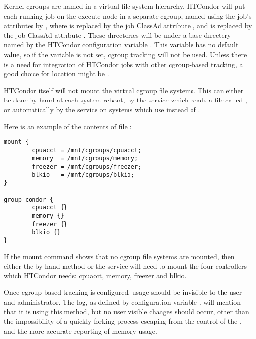 Kernel cgroups are named in a virtual file system hierarchy. 
HTCondor will put each
running job on the execute node in a separate cgroup, 
named using the job's attributes by ,
where  is replaced by 
the job ClassAd attribute ,
and  is replaced by 
the job ClassAd attribute .
These directories will be under a base directory named 
by the HTCondor configuration variable .  
This variable has no default value, so if the variable is not set,
cgroup tracking will not be used.  
Unless there is a need for integration of HTCondor jobs with other
cgroup-based tracking, 
a good choice for  location might be . 

HTCondor itself will not mount the virtual cgroup file systems.  
This can either be done by hand at each system reboot, 
by the  service 
which reads a file called , 
or automatically by the  service 
on systems which use  instead of .

Here is an example of the contents of file :

\begin{verbatim}
mount {
        cpuacct = /mnt/cgroups/cpuacct;
        memory  = /mnt/cgroups/memory;
        freezer = /mnt/cgroups/freezer;
        blkio   = /mnt/cgroups/blkio;
}

group condor {
        cpuacct {}
        memory {}
        freezer {}
        blkio {}
}
\end{verbatim}

If the mount command shows that no cgroup file systems are mounted, 
then either the by hand method or the  service 
will need to mount the four controllers which HTCondor needs:
cpuacct, memory, freezer and blkio.  

Once cgroup-based tracking is configured, 
usage should be invisible to the user and administrator.  
The  log, as defined by configuration variable
, 
will mention that it is using this method, 
but no user visible changes should occur,
other than the impossibility of a quickly-forking process escaping from the
control of the ,
and the more accurate reporting of memory usage.
